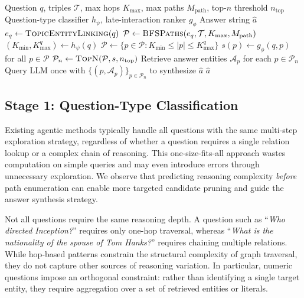 \documentclass[conference]{IEEEtran}
\newcommand{\model}{\textsc{APR}}
\begin{document}
\begin{algorithm}[t]
\caption{\model{} inference (classifier-guided filtering)}
\label{alg:inference}
\begin{algorithmic}[1]
\REQUIRE Question $q$, triples $\mathcal{T}$, max hops $K_{\text{max}}$, max paths $M_{\text{path}}$, top-$n$ threshold $n_{\text{top}}$
\REQUIRE Question-type classifier $h_{\psi}$, late-interaction ranker $g_{\phi}$
\ENSURE Answer string $\hat{a}$
\STATE $e_q \leftarrow \textsc{TopicEntityLinking}(q)$ 
\STATE $\mathcal{P} \leftarrow \textsc{BFSPaths}(e_q, \mathcal{T}, K_{\text{max}}, M_{\text{path}})$ 
\STATE $(K_{\text{min}},K_{\text{max}}^q) \leftarrow h_{\psi}(q)$ 
\STATE $\mathcal{P} \leftarrow \{p\in\mathcal{P}: K_{\text{min}} \le |p| \le K_{\text{max}}^q\}$ 
\STATE $s(p) \leftarrow g_{\phi}(q,p)$ for all $p\in\mathcal{P}$ 
\STATE $\mathcal{P}_n \leftarrow \textsc{TopN}(\mathcal{P}, s, n_{\text{top}})$ 
\STATE Retrieve answer entities $\mathcal{A}_p$ for each $p\in\mathcal{P}_n$
\STATE Query LLM once with $\{(p,\mathcal{A}_p)\}_{p\in\mathcal{P}_n}$ to synthesize $\hat{a}$
\RETURN $\hat{a}$
\end{algorithmic}
\end{algorithm}

\subsection{Stage 1: Question-Type Classification}

Existing agentic methods typically handle all questions with the same multi-step exploration strategy, regardless of whether a question requires a single relation lookup or a complex chain of reasoning. This one-size-fits-all approach wastes computation on simple queries and may even introduce errors through unnecessary exploration. We observe that predicting reasoning complexity \emph{before} path enumeration can enable more targeted candidate pruning and guide the answer synthesis strategy.

Not all questions require the same reasoning depth. A question such as ``\emph{Who directed Inception?}'' requires only one-hop traversal, whereas ``\emph{What is the nationality of the spouse of Tom Hanks?}'' requires chaining multiple relations. While hop-based patterns constrain the structural complexity of graph traversal, they do not capture other sources of reasoning variation. In particular, numeric questions impose an orthogonal constraint: rather than identifying a single target entity, they require aggregation over a set of retrieved entities or literals.
\end{document}
